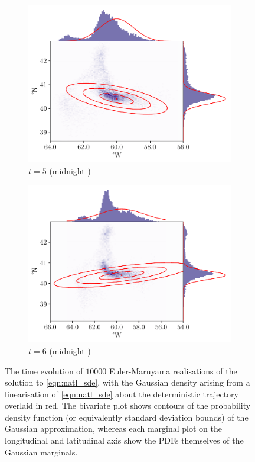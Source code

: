 \begin{figure}
\begin{subfigure}{0.49\textwidth}
		\includegraphics[width=\textwidth]{chp06_applications/figures/gulf_stream/traj_stoch_em_5.0}
		\caption{\(t = 5\) (midnight )}
	\end{subfigure}
	\begin{subfigure}{0.49\textwidth}
		\includegraphics[width=\textwidth]{chp06_applications/figures/gulf_stream/traj_stoch_em_6.0}
		\caption{\(t = 6\) (midnight )}
	\end{subfigure}
	\caption{The time evolution of \(10000\) Euler-Maruyama realisations of the solution to \cref{eqn:natl_sde}, with the Gaussian density arising from a linearisation of \cref{eqn:natl_sde} about the deterministic trajectory overlaid in red.
		The bivariate plot shows contours of the probability density function (or equivalently standard deviation bounds) of the Gaussian approximation, whereas each marginal plot on the longitudinal and latitudinal axis show the PDFs themselves of the Gaussian marginals.}
	\label{fig:natl_em}
\end{figure}


